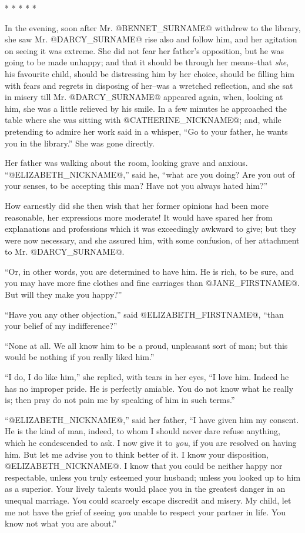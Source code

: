                           * * * * *

In the evening, soon after Mr. @BENNET_SURNAME@ withdrew to the library, she saw
Mr. @DARCY_SURNAME@ rise also and follow him, and her agitation on seeing it was
extreme. She did not fear her father's opposition, but he was going to
be made unhappy; and that it should be through her means--that \textit{she},
his favourite child, should be distressing him by her choice, should be
filling him with fears and regrets in disposing of her--was a wretched
reflection, and she sat in misery till Mr. @DARCY_SURNAME@ appeared again, when,
looking at him, she was a little relieved by his smile. In a few minutes
he approached the table where she was sitting with @CATHERINE_NICKNAME@; and, while
pretending to admire her work said in a whisper, ``Go to your father, he
wants you in the library.'' She was gone directly.

Her father was walking about the room, looking grave and anxious.
``@ELIZABETH_NICKNAME@,'' said he, ``what are you doing? Are you out of your senses, to be
accepting this man? Have not you always hated him?''

How earnestly did she then wish that her former opinions had been more
reasonable, her expressions more moderate! It would have spared her from
explanations and professions which it was exceedingly awkward to give;
but they were now necessary, and she assured him, with some confusion,
of her attachment to Mr. @DARCY_SURNAME@.

``Or, in other words, you are determined to have him. He is rich, to be
sure, and you may have more fine clothes and fine carriages than @JANE_FIRSTNAME@.
But will they make you happy?''

``Have you any other objection,'' said @ELIZABETH_FIRSTNAME@, ``than your belief of my
indifference?''

``None at all. We all know him to be a proud, unpleasant sort of man; but
this would be nothing if you really liked him.''

``I do, I do like him,'' she replied, with tears in her eyes, ``I love him.
Indeed he has no improper pride. He is perfectly amiable. You do not
know what he really is; then pray do not pain me by speaking of him in
such terms.''

``@ELIZABETH_NICKNAME@,'' said her father, ``I have given him my consent. He is the kind
of man, indeed, to whom I should never dare refuse anything, which he
condescended to ask. I now give it to \textit{you}, if you are resolved on
having him. But let me advise you to think better of it. I know
your disposition, @ELIZABETH_NICKNAME@. I know that you could be neither happy nor
respectable, unless you truly esteemed your husband; unless you looked
up to him as a superior. Your lively talents would place you in the
greatest danger in an unequal marriage. You could scarcely escape
discredit and misery. My child, let me not have the grief of seeing
\textit{you} unable to respect your partner in life. You know not what you are
about.''

